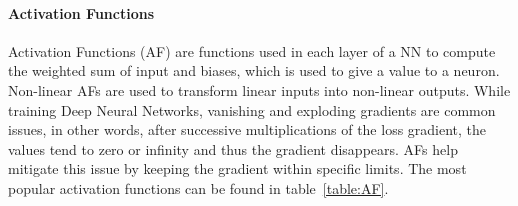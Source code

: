 \paragraph{Activation Functions}

Activation Functions (AF) are functions used in each layer of a NN
to compute the weighted sum of input and biases, which is used to give a value
to a neuron. Non-linear AFs are used to transform linear inputs into non-linear
outputs.  While training Deep Neural Networks, vanishing and exploding
gradients are common issues, in other words, after successive multiplications
of the loss gradient, the values tend to zero or infinity and thus the
gradient disappears. AFs help mitigate this issue by keeping the gradient within
specific limits. The most popular activation functions can be found in
table~\ref{table:AF}.

\begin{table}[]
    \centering
    \resizebox{.6\textwidth}{!}{%
    \begin{tabular}{ll}
    \hline
    \textbf{Activation Functions} & \textbf{Computation Equation} \\ \hline \hline
    Sigmoid                       &  $\displaystyle f(x)=\frac{1}{1+ e^{-x}}$                             \\ \hline
    Tanh                          &  $\displaystyle f(x)=\frac{e^{x}-e^{-x}}{e^{x}+e^{-x}}$                            \\ \hline
    Softmax                       &  $\displaystyle f(x_{i})=\frac{x_{i}}{\sum_{j}e^{x_{j}}}$                             \\ \hline
    ReLU                          &    $ f(x)=\begin{matrix}
        x & if & x\geq 0  \\ 
        0 & if & x< 0 
    \end{matrix} $                           \\ \hline
    LReLU                         &  $f(x)= \begin{matrix}
        x & if & x > 0  \\ 
        \alpha x & if & x \leq 0 
    \end{matrix} $                        \\ \hline
    ELU                           &             $ f(x)=\begin{matrix}
        x & if & x> 0  \\ 
        \alpha e^{x} - 1 & if & x\leq 0 
    \end{matrix} $                 \\ \hline
    \end{tabular}%
    }
    \caption{Popular activation functions}
    \label{table:AF}
\end{table}


